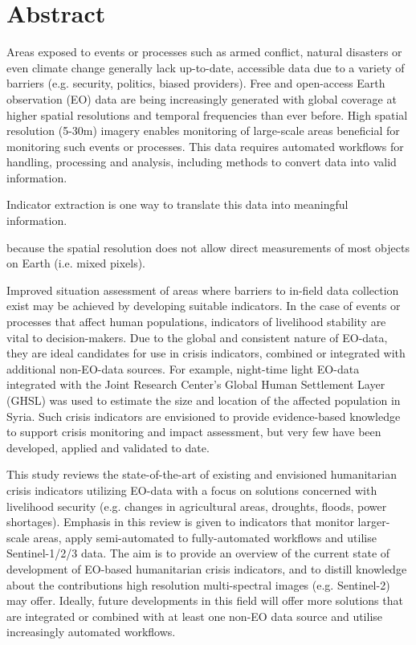 \cleardoublepage
{}
\begingroup
\let\clearpage\relax
\let\cleardoublepage\relax
\let\cleardoublepage\relax

\chapter*{Abstract}

Areas exposed to events or processes such as armed conflict, natural disasters or even climate change generally lack up-to-date, accessible data due to a variety of barriers (e.g. security, politics, biased providers). Free and open-access Earth observation (EO) data are being increasingly generated with global coverage at higher spatial resolutions and temporal frequencies than ever before. High spatial resolution (5-30m) imagery enables monitoring of large-scale areas beneficial for monitoring such events or processes. This data requires automated workflows for handling, processing and analysis, including methods to convert data into valid information.

Indicator extraction is one way to translate this data into meaningful information.

because the spatial resolution does not allow direct measurements of most objects on Earth (i.e. mixed pixels).

Improved situation assessment of areas where barriers to in-field data collection exist may be achieved by developing suitable indicators. In the case of events or processes that affect human populations, indicators of livelihood stability are vital to decision-makers. Due to the global and consistent nature of EO-data, they are ideal candidates for use in crisis indicators, combined or integrated with additional non-EO-data sources.  For example, night-time light EO-data integrated with the Joint Research Center’s Global Human Settlement Layer (GHSL) was used to estimate the size and location of the affected population in Syria. Such crisis indicators are envisioned to provide evidence-based knowledge to support crisis monitoring and impact assessment, but very few have been developed, applied and validated to date.

This study reviews the state-of-the-art of existing and envisioned humanitarian crisis indicators utilizing EO-data with a focus on solutions concerned with livelihood security (e.g. changes in agricultural areas, droughts, floods, power shortages). Emphasis in this review is given to indicators that monitor larger-scale areas, apply semi-automated to fully-automated workflows and utilise Sentinel-1/2/3 data. The aim is to provide an overview of the current state of development of EO-based humanitarian crisis indicators, and to distill knowledge about the contributions high resolution multi-spectral images (e.g. Sentinel-2) may offer. Ideally, future developments in this field will offer more solutions that are integrated or combined with at least one non-EO data source and utilise increasingly automated workflows.

